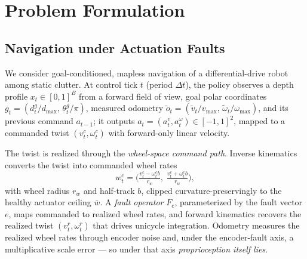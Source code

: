 \documentclass[journal]{IEEEtran}
\begin{document}
\section{Problem Formulation}\label{sec:problem}
\subsection{Navigation under Actuation Faults}
We consider goal-conditioned, mapless navigation of a differential-drive
robot among static clutter. At control tick $t$ (period $\Delta t$), the
policy observes a depth profile $x_t \in [0,1]^{B}$ from a forward field of
view, goal polar coordinates $g_t = (d_t^{g}/d_{\max},\,
\theta_t^{g}/\pi)$, measured odometry $\tilde{o}_t = (\tilde{v}_t/v_{\max},\,
\tilde{\omega}_t/\omega_{\max})$, and its previous command $a_{t-1}$; it
outputs $a_t = (a^{v}_t, a^{\omega}_t) \in [-1,1]^2$, mapped to a commanded
twist $(v^{c}_t, \omega^{c}_t)$ with forward-only linear velocity.

The twist is realized through the \emph{wheel-space command path}. Inverse
kinematics converts the twist into commanded wheel rates
\begin{equation}
w^{c}_t = \Big(\tfrac{v^c_t - \omega^c_t b}{r_w},\;
               \tfrac{v^c_t + \omega^c_t b}{r_w}\Big),
\label{eq:ik}
\end{equation}
with wheel radius $r_w$ and half-track $b$, clipped curvature-preservingly
to the healthy actuator ceiling $\bar{w}$. A \emph{fault operator}
$F_{e}$, parameterized by the fault vector $e$, maps commanded to realized
wheel rates, and forward kinematics recovers the realized twist
$(v^{r}_t, \omega^{r}_t)$ that drives unicycle integration. Odometry
measures the realized wheel rates through encoder noise and, under the
encoder-fault axis, a multiplicative scale error --- so under that axis
\emph{proprioception itself lies}.
\end{document}
